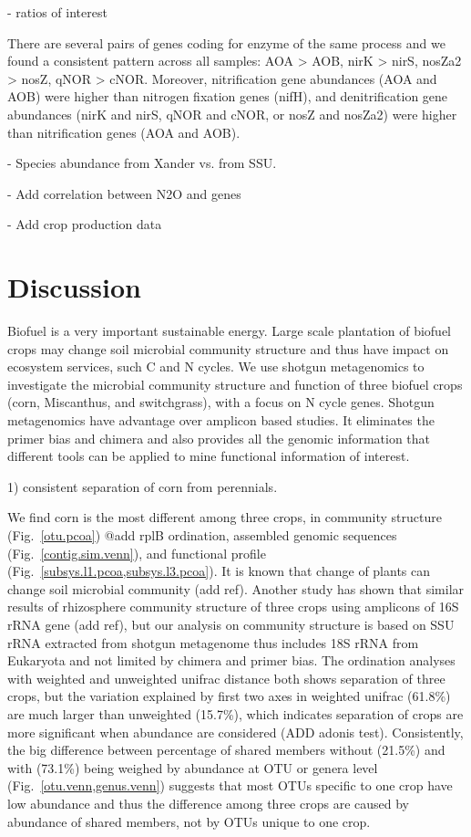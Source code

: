 \documentclass[12pt]{article}
\begin{document}
- ratios of interest

There are several pairs of genes coding for enzyme of the same process and we found a consistent pattern across all samples: AOA {\textgreater} AOB, nirK {\textgreater} nirS, nosZa2 {\textgreater} nosZ, qNOR {\textgreater} cNOR. Moreover, nitrification gene abundances (AOA and AOB) were higher than nitrogen fixation genes (nifH), and denitrification gene abundances (nirK and nirS, qNOR and cNOR, or nosZ and nosZa2) were higher than nitrification genes (AOA and AOB).

- Species abundance from Xander vs. from SSU.

- Add correlation between N2O and genes

- Add crop production data

\section{Discussion}

Biofuel is a very important sustainable energy. Large scale plantation of biofuel crops may change soil microbial community structure and thus have impact on ecosystem services, such C and N cycles. We use shotgun metagenomics to investigate the microbial community structure and function of three biofuel crops (corn, Miscanthus, and switchgrass), with a focus on N cycle genes. Shotgun metagenomics have advantage over amplicon based studies. It eliminates the primer bias and chimera and also provides all the genomic information that different tools can be applied to mine functional information of interest.

1) consistent separation of corn from perennials.

We find corn is the most different among three crops, in community structure (Fig.~\ref{otu.pcoa}) @add rplB ordination, assembled genomic sequences (Fig.~\ref{contig.sim.venn}), and functional profile (Fig.~\ref{subsys.l1.pcoa,subsys.l3.pcoa}). It is known that change of plants can change soil microbial community (add ref). Another study has shown that similar results of rhizosphere community structure of three crops using amplicons of 16S rRNA gene (add ref), but our analysis on community structure is based on SSU rRNA extracted from shotgun metagenome thus includes 18S rRNA from Eukaryota and not limited by chimera and primer bias. The ordination analyses with weighted and unweighted unifrac distance both shows separation of three crops, but the variation explained by first two axes in weighted unifrac (61.8\%) are much larger than unweighted (15.7\%), which indicates separation of crops are more significant when abundance are considered (ADD adonis test). Consistently, the big difference between percentage of shared members without (21.5\%) and with (73.1\%) being weighed by abundance at OTU or genera level (Fig.~\ref{otu.venn,genus.venn}) suggests that most OTUs specific to one crop have low abundance and thus the difference among three crops are caused by abundance of shared members, not by OTUs unique to one crop. 
\end{document}
